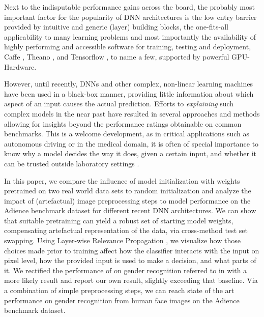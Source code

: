 \documentclass[10pt,twocolumn,letterpaper]{article}
\begin{document}
Next to the indisputable performance gains across the board, the probably most important factor for the popularity of DNN architectures is the low entry barrier provided by intuitive and generic (layer) building blocks, the one-fits-all applicability to many learning problems and most importantly the availability of highly performing and accessible software for training, testing and deployment,  \eg Caffe \cite{jia2014caffe}, Theano \cite{2016arXiv160502688short}, and Tensorflow \cite{tensorflow2015-whitepaper}, to name a few,  supported by powerful GPU-Hardware.

However, until recently, DNNs and other complex, non-linear learning machines have been used in a black-box manner, providing little information about which aspect of an input causes the actual prediction. Efforts to \textit{explaining} such complex models in the near past have resulted in several approaches and methods \cite{zeiler2014visualizing,zintgraf2016new,ribeiro2016should,gevrey2003review,baehrens2010explain, simonyan2013deep,bach2015pixel} allowing for insights beyond the performance ratings obtainable on common benchmarks. This is a welcome development, as in critical applications such as autonomous driving or in the medical domain, it is often of special importance to know why a model decides the way it does, given a certain input, and whether it can be trusted outside laboratory settings \cite{lapuschkin2016analyzing}.

In this paper, we compare the influence of model initialization with weights pretrained on two real world data sets to random initialization and analyze the impact of (artefactual) image preprocessing steps to model performance on the Adience benchmark dataset for different recent DNN architectures.
We can show that suitable pretraining can yield a robust set of starting model weights, compensating artefactual representation of the data, via cross-method test set swapping.
Using Layer-wise Relevance Propagation \cite{bach2015pixel}, we visualize how those choices made prior to training affect how the classifier interacts with the input on pixel level, \ie how the provided input is used to make a decision, and what parts of it. We rectified the performance of \cite{rothe2016deep} on gender recognition referred to in \cite{dehghan2017dager} with a more likely result and report our own result, slightly exceeding that baseline. Via a combination of simple preprocessing steps, we can reach state of the art performance on gender recognition from human face images on the Adience benchmark dataset.
\end{document}
